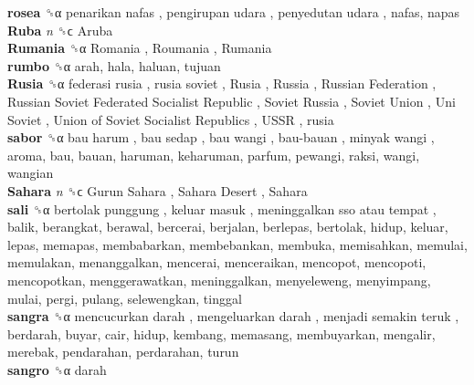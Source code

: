 \textbf{rosea} ␝α   penarikan nafas ,  pengirupan udara ,  penyedutan udara , nafas, napas  \\
\textbf{Ruba} \emph{n}  ␝ϲ   Aruba   \\
\textbf{Rumania} ␝α   Romania ,  Roumania ,  Rumania   \\
\textbf{rumbo} ␝α  arah, hala, haluan, tujuan  \\
\textbf{Rusia} ␝α   federasi rusia ,  rusia soviet ,  Rusia ,  Russia ,  Russian Federation ,  Russian Soviet Federated Socialist Republic ,  Soviet Russia ,  Soviet Union ,  Uni Soviet ,  Union of Soviet Socialist Republics ,  USSR , rusia  \\
\textbf{sabor} ␝α   bau harum ,  bau sedap ,  bau wangi ,  bau-bauan ,  minyak wangi , aroma, bau, bauan, haruman, keharuman, parfum, pewangi, raksi, wangi, wangian  \\
\textbf{Sahara} \emph{n}  ␝ϲ   Gurun Sahara ,  Sahara Desert ,  Sahara   \\
\textbf{sali} ␝α   bertolak punggung ,  keluar masuk ,  meninggalkan sso atau tempat , balik, berangkat, berawal, bercerai, berjalan, berlepas, bertolak, hidup, keluar, lepas, memapas, membabarkan, membebankan, membuka, memisahkan, memulai, memulakan, menanggalkan, mencerai, menceraikan, mencopot, mencopoti, mencopotkan, menggerawatkan, meninggalkan, menyeleweng, menyimpang, mulai, pergi, pulang, selewengkan, tinggal  \\
\textbf{sangra} ␝α   mencucurkan darah ,  mengeluarkan darah ,  menjadi semakin teruk , berdarah, buyar, cair, hidup, kembang, memasang, membuyarkan, mengalir, merebak, pendarahan, perdarahan, turun  \\
\textbf{sangro} ␝α  darah  \\
